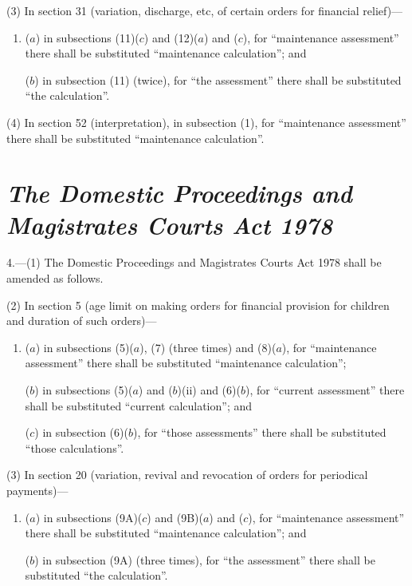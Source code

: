 \documentclass[12pt,a4paper]{article}
\begin{document}
(3) In section 31 (variation, discharge, etc, of certain orders for financial relief)—
\begin{enumerate}\item[]
($a$) in subsections (11)($c$)  and (12)($a$)  and ($c$), for “maintenance assessment” there shall be substituted “maintenance calculation”; and

($b$) in subsection (11) (twice), for “the assessment” there shall be substituted “the calculation”.
\end{enumerate}

(4) In section 52 (interpretation), in subsection (1), for “maintenance assessment” there shall be substituted “maintenance calculation”.


\section*{\itshape The Domestic Proceedings and Magistrates Courts Act 1978}

4.---(1) The Domestic Proceedings and Magistrates Courts Act 1978 shall be amended as follows.

(2) In section 5 (age limit on making orders for financial provision for children and duration of such orders)—
\begin{enumerate}\item[]
($a$) in subsections (5)($a$), (7)  (three times) and (8)($a$), for “maintenance assessment” there shall be substituted “maintenance calculation”;

($b$) in subsections (5)($a$)  and ($b$)(ii)  and (6)($b$), for “current assessment” there shall be substituted “current calculation”; and

($c$) in subsection (6)($b$), for “those assessments” there shall be substituted “those calculations”.
\end{enumerate}

(3) In section 20 (variation, revival and revocation of orders for periodical payments)—
\begin{enumerate}\item[]
($a$) in subsections (9A)($c$)  and (9B)($a$)  and ($c$), for “maintenance assessment” there shall be substituted “maintenance calculation”; and

($b$) in subsection (9A) (three times), for “the assessment” there shall be substituted “the calculation”.
\end{enumerate}
\end{document}
